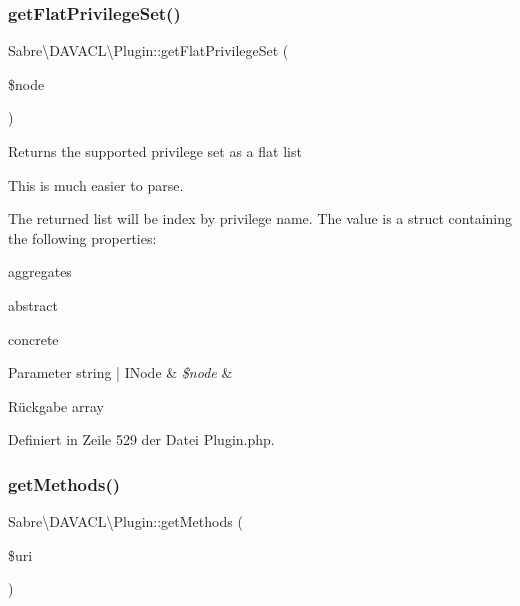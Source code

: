 \subsubsection{\texorpdfstring{get\+Flat\+Privilege\+Set()}{getFlatPrivilegeSet()}}
{\footnotesize\ttfamily Sabre\textbackslash{}\+D\+A\+V\+A\+C\+L\textbackslash{}\+Plugin\+::get\+Flat\+Privilege\+Set (\begin{DoxyParamCaption}\item[{}]{\$node }\end{DoxyParamCaption})\hspace{0.3cm}{\ttfamily [final]}}

Returns the supported privilege set as a flat list

This is much easier to parse.

The returned list will be index by privilege name. The value is a struct containing the following properties\+:
\begin{DoxyItemize}
\item aggregates
\item abstract
\item concrete
\end{DoxyItemize}


\begin{DoxyParams}[1]{Parameter}
string | I\+Node & {\em \$node} & \\
\hline
\end{DoxyParams}
\begin{DoxyReturn}{Rückgabe}
array 
\end{DoxyReturn}


Definiert in Zeile 529 der Datei Plugin.\+php.

\mbox{\label{class_sabre_1_1_d_a_v_a_c_l_1_1_plugin_a96fcd7e07ef9e4bb229e5afdff1d41f9}} 
\subsubsection{\texorpdfstring{get\+Methods()}{getMethods()}}
{\footnotesize\ttfamily Sabre\textbackslash{}\+D\+A\+V\+A\+C\+L\textbackslash{}\+Plugin\+::get\+Methods (\begin{DoxyParamCaption}\item[{}]{\$uri }\end{DoxyParamCaption})}

